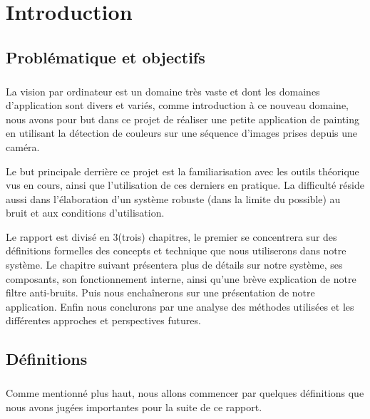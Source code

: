 \documentclass[12pt]{report}
\begin{document}
 
\tableofcontents
\listoffigures
\listoftables


\newpage

\chapter{Introduction}
	\section{Problématique et objectifs }
	\paragraph{}
	La vision par ordinateur est un domaine très vaste et dont les domaines d'application sont
	divers et variés, comme introduction à ce nouveau domaine, nous avons pour but dans ce projet
	de réaliser une petite application de painting en utilisant la détection de couleurs sur une 
	séquence d'images prises depuis une caméra.
	\par 
	Le but principale derrière ce projet est la familiarisation avec les outils théorique vus en cours,
	ainsi que l'utilisation de ces derniers en pratique. La difficulté réside aussi dans l'élaboration
	d'un système robuste (dans la limite du possible) au bruit et aux conditions d'utilisation.
	\par 
	Le rapport est divisé en 3(trois) chapitres, le premier se concentrera sur des définitions formelles
	des concepts et technique que nous utiliserons dans notre système. Le chapitre suivant présentera
	plus de détails sur notre système, ses composants, son fonctionnement interne, ainsi qu'une brève
	explication de notre filtre anti-bruits. Puis nous enchaînerons sur une présentation de notre
	application. Enfin nous conclurons par une analyse des méthodes utilisées et les différentes 
	approches et perspectives futures.
	
	\section{Définitions}
	\paragraph{}
	Comme mentionné plus haut, nous allons commencer par quelques définitions que nous avons jugées 
	importantes pour la suite de ce rapport.
	
\end{document}
